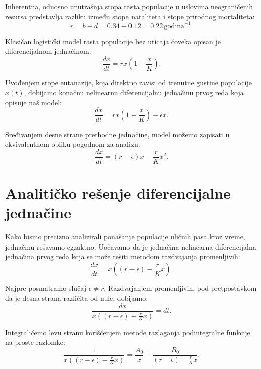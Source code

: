 \documentclass[12pt]{article}
\begin{document}
Inherentna, odnosno unutrašnja stopa rasta populacije u uslovima neograničenih resursa predstavlja razliku između stope nataliteta i stope prirodnog mortaliteta:
\begin{equation}
r = b - d = 0.34 - 0.12 = 0.22 \, \text{godina}^{-1}.
\end{equation}

Klasičan logistički model rasta populacije bez uticaja čoveka opisan je diferencijalnom jednačinom:
\begin{equation}
\frac{dx}{dt} = r x \left(1 - \frac{x}{K}\right).
\end{equation}

Uvođenjem stope eutanazije, koja direktno zavisi od trenutne gustine populacije $x(t)$, dobijamo konačnu nelinearnu diferencijalnu jednačinu prvog reda koja opisuje naš model:
\begin{equation}
\frac{dx}{dt} = r x \left(1 - \frac{x}{K}\right) - \epsilon x.
\end{equation}

Sređivanjem desne strane prethodne jednačine, model možemo zapisati u ekvivalentnom obliku pogodnom za analizu:
\begin{equation}
\frac{dx}{dt} = (r - \epsilon)x - \frac{r}{K}x^2.
\end{equation}

\section{Analitičko rešenje diferencijalne jednačine}

Kako bismo precizno analizirali ponašanje populacije uličnih pasa kroz vreme, jednačinu rešavamo egzaktno. Uočavamo da je jednačina nelinearna diferencijalna jednačina prvog reda koja se može rešiti metodom razdvajanja promenljivih:
\begin{equation}
\frac{dx}{dt} = x \left((r - \epsilon) - \frac{r}{K}x\right).
\end{equation}

Najpre posmatramo slučaj $\epsilon \neq r$. Razdvajanjem promenljivih, pod pretpostavkom da je desna strana različita od nule, dobijamo:
\begin{equation}
\frac{dx}{x \left((r - \epsilon) - \frac{r}{K}x\right)} = dt.
\end{equation}

Integralićemo levu stranu korišćenjem metode razlaganja podintegralne funkcije na proste razlomke:
\begin{equation}
\frac{1}{x \left((r - \epsilon) - \frac{r}{K}x\right)} = \frac{A_0}{x} + \frac{B_0}{(r - \epsilon) - \frac{r}{K}x}.
\end{equation}
\end{document}
